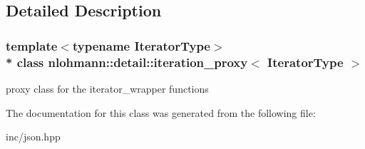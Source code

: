 \subsection{Detailed Description}
\subsubsection*{template$<$typename Iterator\+Type$>$\\*
class nlohmann\+::detail\+::iteration\+\_\+proxy$<$ Iterator\+Type $>$}

proxy class for the iterator\+\_\+wrapper functions 

The documentation for this class was generated from the following file\+:\begin{DoxyCompactItemize}
\item 
inc/json.\+hpp\end{DoxyCompactItemize}
